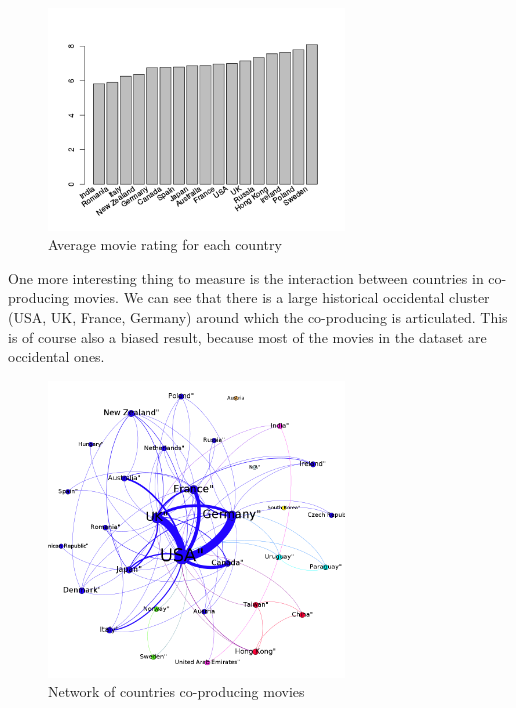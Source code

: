 \begin{figure}[!h]
\begin{center}
\includegraphics[width=0.70\textwidth]{../src/pre-processing/stats/results/rateByCountry.png}
\end{center}
\caption{Average movie rating for each country}
\label{fig:rateByCountry}
\end{figure}

One more interesting thing to measure is the interaction between countries in co-producing movies.
We can see that there is a large historical occidental cluster (USA, UK, France, Germany) around which the co-producing is articulated.
This is of course also a biased result, because most of the movies in the dataset are occidental ones.

\begin{figure}[!h]
\begin{center}
\includegraphics[width=0.7\textwidth]{../src/pre-processing/stats/results/CoocCountry.png}
\end{center}
\caption{Network of countries co-producing movies}
\label{fig:coocCountry}
\end{figure}

